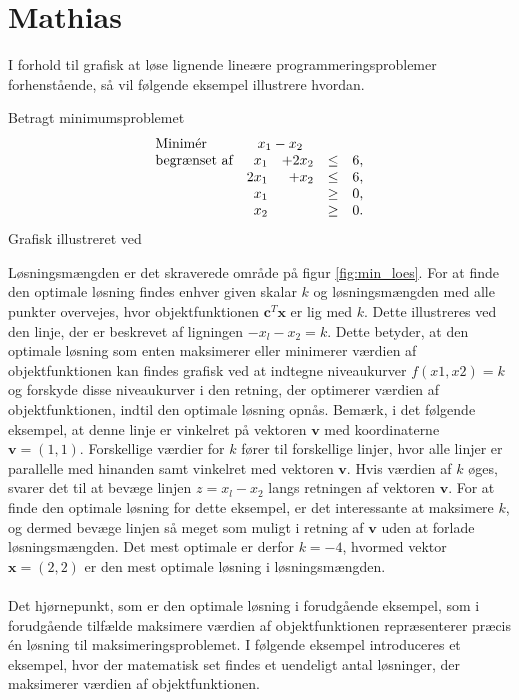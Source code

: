\section{Mathias}

I forhold til grafisk at løse lignende lineære programmeringsproblemer forhenstående, så vil følgende eksempel illustrere hvordan. 

\begin{eks}
\label{eks:min_loes}
Betragt minimumsproblemet
%
\begin{align*}
\begin{array}{lrrlr}
\text{Minimér}		&	\multicolumn{2}{c}{x_1-x_2}  &\\
\text{begrænset af}	&x_1& + 2x_2			&\leq 	& 6,\\
					&2x_1& + x_2			&\leq	& 6,\\
					&x_1&    				&\geq	& 0,\\
					&x_2&    				&\geq	& 0.\\
\end{array}
\end{align*}
%
Grafisk illustreret ved 
%

\end{eks}
\noindent
Løsningsmængden er det skraverede område på figur \ref{fig:min_loes}. For at finde den optimale løsning findes enhver given skalar $k$ og løsningsmængden med alle punkter overvejes, hvor objektfunktionen $\textbf{c}^T\textbf{x}$ er lig med $k$. Dette illustreres ved den linje, der er beskrevet af ligningen $-x_l-x_2=k$. Dette betyder, at den optimale løsning som enten maksimerer eller minimerer værdien
af objektfunktionen kan findes grafisk ved at indtegne niveaukurver $f(x1, x2)=k$ og forskyde disse niveaukurver i den retning, der optimerer værdien af objektfunktionen, indtil den optimale løsning opnås.  Bemærk, i det følgende eksempel, at denne linje er vinkelret på vektoren $\textbf{v}$ med koordinaterne $\textbf{v}=(1,1)$.
Forskellige værdier for $k$ fører til forskellige linjer, hvor  alle linjer er parallelle med hinanden samt vinkelret med vektoren $\textbf{v}$. Hvis værdien af $k$ øges, svarer det til at bevæge linjen $z=x_l-x_2$ langs retningen af vektoren $\textbf{v}$. For at finde den optimale løsning for dette eksempel, er det interessante at maksimere $k$, og dermed bevæge linjen så meget som muligt i retning af $\textbf{v}$ uden at forlade løsningsmængden. Det mest optimale er derfor $k = -4$, hvormed vektor $\textbf{x}=(2,2)$ er den mest optimale løsning i løsningsmængden. \\\\
Det hjørnepunkt, som er den optimale løsning i forudgående eksempel, som i forudgående tilfælde maksimere værdien
af objektfunktionen repræsenterer præcis én
løsning til maksimeringsproblemet. I følgende eksempel introduceres et eksempel, hvor der matematisk set findes et uendeligt antal løsninger, der
maksimerer værdien af objektfunktionen.
